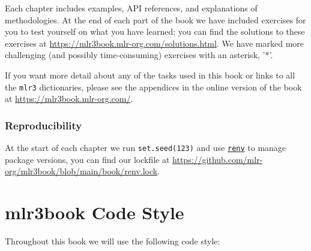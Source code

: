 Each chapter includes examples, API references, and explanations of
methodologies. At the end of each part of the book we have included
exercises for you to test yourself on what you have learned; you can
find the solutions to these exercises at
\url{https://mlr3book.mlr-org.com/solutions.html}. We have marked more
challenging (and possibly time-consuming) exercises with an asterisk,
'*'.

If you want more detail about any of the tasks used in this book or
links to all the \texttt{mlr3} dictionaries, please see the appendices
in the online version of the book at
\url{https://mlr3book.mlr-org.com/}.

\hypertarget{reproducibility}{%
\subsubsection*{Reproducibility}\label{reproducibility}}

At the start of each chapter we run \texttt{set.seed(123)} and use
\href{https://cran.r-project.org/package=renv}{\texttt{renv}} to manage package versions, you can find our
lockfile at
\url{https://github.com/mlr-org/mlr3book/blob/main/book/renv.lock}.

\hypertarget{styleguide}{%
\section{mlr3book Code Style}\label{styleguide}}

Throughout this book we will use the following code style:

